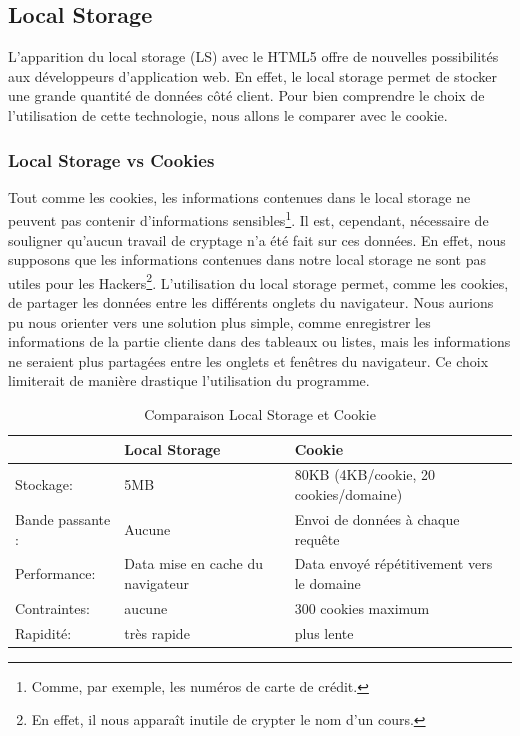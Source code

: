 \subsection{Local Storage}
L'apparition du local storage (LS) avec le HTML5 offre de nouvelles possibilités aux développeurs d'application web. En effet, le local storage permet de stocker une grande quantité de données côté client. Pour bien comprendre le choix de l'utilisation de cette technologie, nous allons le comparer avec le cookie.

\subsubsection{Local Storage vs Cookies}

Tout comme les cookies, les informations contenues dans le local storage ne peuvent pas contenir d'informations sensibles\footnote{Comme, par exemple, les numéros de carte de crédit.}. Il est, cependant, nécessaire de souligner qu'aucun travail de cryptage n'a été fait sur ces données. En effet, nous supposons que les informations contenues dans notre local storage ne sont pas utiles pour les Hackers\footnote{En effet, il nous apparaît inutile de crypter le nom d'un cours.}. 
\newline
\indent
L'utilisation du local storage permet, comme les cookies, de partager les données entre les différents onglets du navigateur. Nous aurions pu nous orienter vers une solution plus simple, comme enregistrer les informations de la partie cliente dans des tableaux ou listes, mais les informations ne seraient plus partagées entre les onglets et fenêtres du navigateur. Ce choix limiterait de manière drastique l'utilisation du programme. 


\begin{table}[!h]
\begin{center}
\begin{tabular}{|l|l|l|}
  	\hline
   		& Local Storage & Cookie \\
  	\hline
  		Stockage: & 5MB & 80KB (4KB/cookie, 20 cookies/domaine) \\
	\hline  
		Bande passante : & Aucune & Envoi de données à chaque requête \\
  	\hline
  		Performance: & Data mise en cache du navigateur & Data envoyé répétitivement vers le domaine \\
  	\hline
  		Contraintes: & aucune & 300 cookies maximum \\
  	\hline
  		Rapidité: & très rapide & plus lente \\
  	\hline
\end{tabular}
\end{center}
\caption{Comparaison Local Storage et Cookie}
\label{local_storage}
\end{table}

